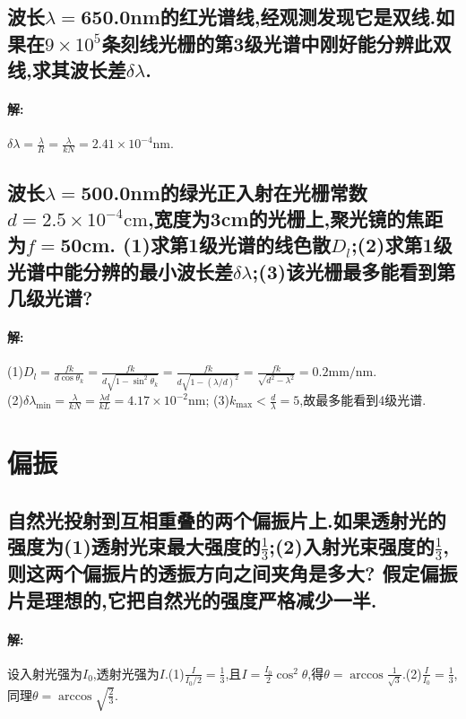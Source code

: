 \documentclass[UTF8]{article}
\newcommand{\cm}{\mathrm{cm}}
\newcommand{\mm}{\mathrm{mm}}
\newcommand{\nm}{\mathrm{nm}}
\begin{document}
    \addtocounter{subsection}{1}
    \subsection{波长$\lambda=$650.0nm的红光谱线,经观测发现它是双线.如果在$9\times 10^5$条刻线光栅的第3级光谱中刚好能分辨此双线,求其波长差$\delta \lambda$.} %
    \paragraph{解: }$\delta \lambda=\frac{\lambda}{R}=\frac{\lambda}{kN}=2.41\times 10^{-4} \nm$.

    \addtocounter{subsection}{1}
    \subsection{波长$\lambda=$500.0nm的绿光正入射在光栅常数$d=2.5\times 10^{-4}\cm$,宽度为3cm的光栅上,聚光镜的焦距为$f=$50cm. (1)求第1级光谱的线色散$D_l$;(2)求第1级光谱中能分辨的最小波长差$\delta\lambda$;(3)该光栅最多能看到第几级光谱?} %
    \paragraph{解: }(1)$D_l=\frac{fk}{d\cos\theta_k}=\frac{fk}{d\sqrt{1-\sin^2 \theta_k}}=\frac{fk}{d\sqrt{1-(\lambda/d)^2}}=\frac{fk}{\sqrt{d^2-\lambda^2}}=0.2\mm/\nm.$\\ 
    (2)$\delta\lambda_{\mathrm{min}}=\frac{\lambda}{kN}=\frac{\lambda d}{kL}=4.17\times 10^{-2}\nm$; (3)$k_{\mathrm{max}}<\frac{d}{\lambda}=5$,故最多能看到4级光谱.

    \addtocounter{section}{1}
    \section{偏振}
    \subsection{自然光投射到互相重叠的两个偏振片上.如果透射光的强度为(1)透射光束最大强度的$\frac{1}{3}$;(2)入射光束强度的$\frac{1}{3}$,则这两个偏振片的透振方向之间夹角是多大? 假定偏振片是理想的,它把自然光的强度严格减少一半.} %
    \paragraph{解: }设入射光强为$I_0$,透射光强为$I$.(1)$\frac{I}{I_0/2}=\frac{1}{3}$,且$I=\frac{I_0}{2}\cos^2\theta$,得$\theta=\arccos \frac{1}{\sqrt{3}}$.(2)$\frac{I}{I_0}=\frac{1}{3}$,同理$\theta=\arccos\sqrt{\frac{2}{3}}$.
\end{document}
